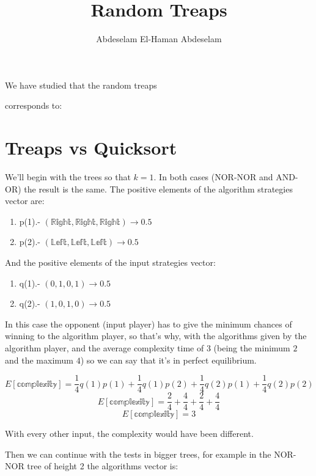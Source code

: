\documentclass[a4paper,10pt]{article}
\title{Random Treaps}
\author{Abdeselam El-Haman Abdeselam}
\begin{document}
\sloppy
\maketitle

We have studied that the random treaps

corresponds to:\\

\scalebox{0.7}{}

\section{Treaps vs Quicksort}

We'll begin with the trees so that $k=1$. In both cases (NOR-NOR and AND-OR) the
result is the same. The positive elements of the algorithm strategies vector are:
 \begin{enumerate}
   \item p(1).- $(\mathbb{Right},\mathbb{Right},\mathbb{Right}) \to 0.5$
   \item p(2).- $(\mathbb{Left},\mathbb{Left},\mathbb{Left}) \to 0.5$
 \end{enumerate}

And the positive elements of the input strategies vector:
\begin{enumerate}
  \item q(1).- $(0,1,0,1) \to 0.5$
  \item q(2).- $(1,0,1,0) \to 0.5$
\end{enumerate}

In this case the opponent (input player) has to give the minimum chances of winning
to the algorithm player, so that's why, with the algorithms given by the algorithm player,
and the average complexity time of $3$ (being the minimum $2$ and the maximum $4$) so we can
say that it's in perfect equilibrium.

$$E[\mathbb{complexity}] = \frac{1}{4}q(1)p(1) + \frac{1}{4}q(1)p(2) + \frac{1}{4}q(2)p(1) + \frac{1}{4}q(2)p(2)$$
$$E[\mathbb{complexity}] = \frac{2}{4} + \frac{4}{4} + \frac{2}{4} + \frac{4}{4}$$
$$E[\mathbb{complexity}] = 3$$

With every other input, the complexity would have been different.

Then we can continue with the tests in bigger trees, for example in the NOR-NOR tree
of height 2 the algorithms vector is:
\end{document}
